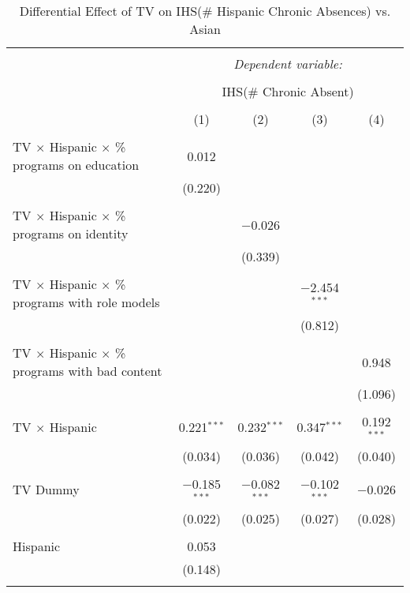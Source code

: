 
\begin{table}[!htbp] \centering 
  \caption{Differential Effect of TV on IHS(\# Hispanic Chronic Absences) vs. Asian} 
  \label{} 
\begin{tabular}{@{\extracolsep{-2pt}}lcccc} 
\\[-1.8ex]\hline 
\hline \\[-1.8ex] 
 & \multicolumn{4}{c}{\textit{Dependent variable:}} \\ 
\cline{2-5} 
\\[-1.8ex] & \multicolumn{4}{c}{IHS(\# Chronic Absent)} \\ 
\\[-1.8ex] & (1) & (2) & (3) & (4)\\ 
\hline \\[-1.8ex] 
 TV $\times$ Hispanic $\times$ \% programs on education & 0.012 &  &  &  \\ 
  & (0.220) &  &  &  \\ 
  & & & & \\ 
 TV $\times$ Hispanic $\times$ \% programs on identity &  & $-$0.026 &  &  \\ 
  &  & (0.339) &  &  \\ 
  & & & & \\ 
 TV $\times$ Hispanic $\times$ \% programs with role models &  &  & $-$2.454$^{***}$ &  \\ 
  &  &  & (0.812) &  \\ 
  & & & & \\ 
 TV $\times$ Hispanic $\times$ \% programs with bad content &  &  &  & 0.948 \\ 
  &  &  &  & (1.096) \\ 
  & & & & \\ 
 TV $\times$ Hispanic & 0.221$^{***}$ & 0.232$^{***}$ & 0.347$^{***}$ & 0.192$^{***}$ \\ 
  & (0.034) & (0.036) & (0.042) & (0.040) \\ 
  & & & & \\ 
 TV Dummy & $-$0.185$^{***}$ & $-$0.082$^{***}$ & $-$0.102$^{***}$ & $-$0.026 \\ 
  & (0.022) & (0.025) & (0.027) & (0.028) \\ 
  & & & & \\ 
 Hispanic & 0.053 &  &  &  \\ 
  & (0.148) &  &  &  \\ 
  & & & & \\ 

\end{tabular}
\end{table}
